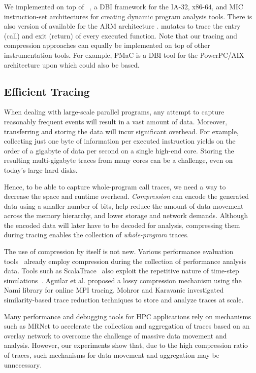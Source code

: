  
%


We implemented \parlot on top of \pin~\cite{pin}, a DBI framework for the IA-32, x86-64, and MIC instruction-set architectures for creating dynamic program analysis tools. There is also version of \pin available for the ARM architecture \cite{pinarm}. \parlot mutates \pin to trace the entry (call) and exit (return) of every executed function. Note that our tracing and compression approaches can equally be implemented on top of other instrumentation tools. For example, PMaC \cite{pmac} is a DBI tool for the PowerPC/AIX architecture upon which \parlot could also be based.


\subsection{Efficient Tracing}
When dealing with large-scale parallel programs, any attempt to capture reasonably frequent events will result in a vast amount of data. Moreover, transferring and storing the data will incur significant overhead. For example, collecting just one byte of information per executed instruction yields on the order of a gigabyte of data per second on a single high-end core. Storing the resulting multi-gigabyte traces from many cores can be a challenge, even on today's large hard disks.

Hence, to be able to capture whole-program call traces, we need a way to decrease the space and runtime overhead. \textit{Compression} can encode the generated data using a smaller number of bits, help
reduce the amount of data movement across the memory hierarchy, and
lower storage and network demands.
%
Although the encoded data will later have to be decoded for analysis, compressing them during tracing enables the collection of {\em whole-program} traces.

The use of compression by itself is not new.
Various performance evaluation tools~\cite{tau,scorep,eventflowgraph} 
already employ compression during the collection
of performance analysis data.
%
Tools such as ScalaTrace~\cite{scalatrace}
also exploit
the repetitive nature of time-step simulations~\cite{freitag}. Aguilar et al. \cite{aguilar} proposed a lossy compression mechanism using the Nami library \cite{gamblinNami} for online MPI tracing. Mohror and Karavanic \cite{mohror} investigated similarity-based trace reduction techniques to store and analyze traces at scale. 


Many performance and debugging tools for HPC applications \cite{stat,taumrnet} rely on mechanisms such as MRNet \cite{mrnet} to accelerate the collection and aggregation of traces based on an overlay network to overcome the challenge of massive data movement and analysis. However, our experiments show that, due to the high compression ratio of \parlot traces, such mechanisms for data movement and aggregation may be unnecessary.


